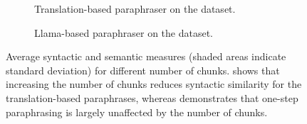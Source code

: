 \begin{figure}[htbp]
  \centering
  \begin{subfigure}[b]{\textwidth}
    \centering
    
    \caption[Translation-based paraphraser on \dataBlog{}.]{
    Translation-based paraphraser on the \dataBlog{} dataset.    
    }
    \label{fig:abl_chunks_blog_translation}
  \end{subfigure}
  \hfill
  \begin{subfigure}[b]{\textwidth}
    \centering
    
    \caption[Llama-based paraphraser on \dataStudent{}.]{Llama-based paraphraser on the \dataStudent{} dataset.
    }
    \label{fig:abl_chunks_student_essays_llama}
  \end{subfigure}
  \caption[Average syntactic and semantic measures for different chunk numbers.]{Average syntactic and semantic measures (shaded areas indicate standard deviation) for different number of chunks.
   shows that increasing the number of chunks reduces syntactic similarity for the translation-based paraphrases, whereas  demonstrates that one-step paraphrasing is largely unaffected by the number of chunks.
  }
  \label{fig:abl_chunks}
\end{figure}